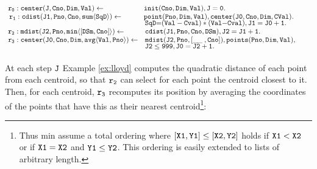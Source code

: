 \documentclass[11pt]{article}
\def\mt{\tt}
\newcommand{\cldl}{\[\begin{array}{ll}}
\newcommand{\eldl}{\end{array}\]\rm}
\newcommand{\prule}[2]{ \mt #1 \leftarrow & \mt #2 \\}
\def\pbody#1#2{ \mt #1 & \mt #2 \\}
\def\sinv{\vspace{-0.1cm}}
\def\pin{\vspace{0.1cm}}
\def\sinv{\vspace{-0.1cm}}
\def\pinv{\vspace{0.1cm}}
\def\rof#1{$\tt r_{#1}$}
\def\f--{\tt{ \_\!\_\;}}
\begin{document}

\sinv\begin{example} 
 \label{ex:lloyd}
 
 ~\\[-0.5cm]
 
 \cldl
  \prule{\!r_0:center(J, Cno, Dim, Val)}{\! init(Cno, Dim, Val), J=0. \hspace{2cm}}
  \prule{r_1:cdist(J1, Pno, Cno, sum\langle SqD\rangle)}{\!point(Pno, Dim, Val) ,  center(J0, Cno, Dim, CVal).~~~~~~\sinv}
  \pbody{} {SqD{=} (Val-Cval)*(Val {-} Cval), J1=J0+1.}
  \prule{\!r_2:mdist(J2, Pno, min \langle  [DSm, Cno] \rangle)}{ cdist(J1, Pno, Cno,  DSm),J2=J1+1.} 
\prule{\!r_3:center(J0, Cno,  Dim, avg \langle Val, Pno\rangle )}{mdist(J2, Pno, [\f--, Cno]), points( Pno, Dim, Val),\sinv}
\pbody{}{J2 \leq 999, J0=J2+1.\pinv}
\eldl
\end{example}
At each step $\tt J$  Example \ref{ex:lloyd} computes the
  quadratic distance of each point from each  centroid,  so that \rof{2}
 can select for each point the centroid closest to it. Then,  for each centroid, \rof{3}
recomputes its  position by averaging the coordinates of the points
that have this as their nearest centroid\footnote{Thus min assume a total ordering where  $\tt  [X1, Y1] \leq [X2, Y2]$ holds if  
$\tt X1< X2$ or if   $\tt X1=X2$ and $\tt Y1 \leq Y2$. This ordering is
easily extended to lists of arbitrary length.}:
\end{document}
